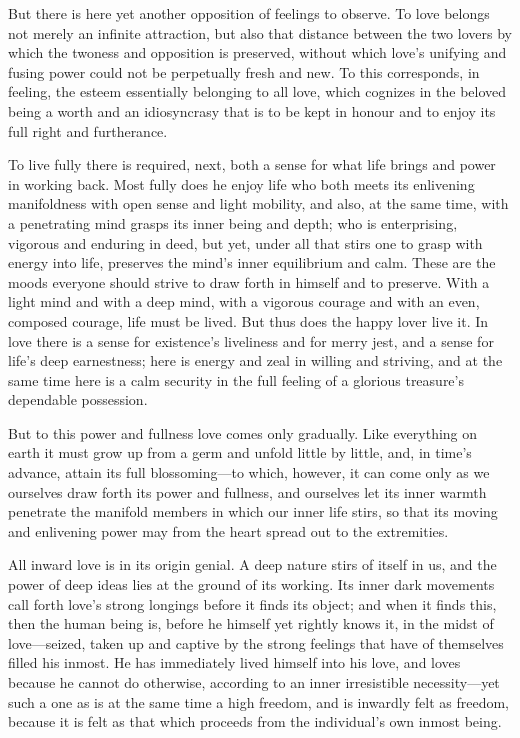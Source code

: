\documentclass[12pt,a4paper]{book}
\begin{document}
But there is here yet another opposition of feelings to observe. To love
belongs not merely an infinite attraction, but also that distance between
the two lovers by which the twoness and opposition is preserved, without
which love's unifying and fusing power could not be perpetually fresh and
new. To this corresponds, in feeling, the esteem essentially belonging to
all love, which cognizes in the beloved being a worth and an idiosyncrasy
that is to be kept in honour and to enjoy its full right and furtherance.

To live fully there is required, next, both a sense for what life brings and
power in working back. Most fully does he enjoy life who both meets its
enlivening manifoldness with open sense and light mobility, and also, at the
same time, with a penetrating mind grasps its inner being and depth; who is
enterprising, vigorous and enduring in deed, but yet, under all that stirs
one to grasp with energy into life, preserves the mind's inner equilibrium
and calm. These are the moods everyone should strive to draw forth in
himself and to preserve. With a light mind and with a deep mind, with a
vigorous courage and with an even, composed courage, life must be lived.
But thus does the happy lover live it. In love there is a sense for
existence's liveliness and for merry jest, and a sense for life's deep
earnestness; here is energy and zeal in willing and striving, and at the
same time here is a calm security in the full feeling of a glorious treasure's
dependable possession.

But to this power and fullness love comes only gradually. Like everything on
earth it must grow up from a germ and unfold little by little, and, in
time's advance, attain its full blossoming---to which, however, it can come
only as we ourselves draw forth its power and fullness, and ourselves let
its inner warmth penetrate the manifold members in which our inner life
stirs, so that its moving and enlivening power may from the heart spread out
to the extremities.

All inward love is in its origin genial. A deep nature stirs of itself in
us, and the power of deep ideas lies at the ground of its working. Its inner
dark movements call forth love's strong longings before it finds its
object; and when it finds this, then the human being is, before he himself
yet rightly knows it, in the midst of love---seized, taken up and captive by
the strong feelings that have of themselves filled his inmost. He has
immediately lived himself into his love, and loves because he cannot do
otherwise, according to an inner irresistible necessity---yet such a one as
is at the same time a high freedom, and is inwardly felt as freedom, because
it is felt as that which proceeds from the individual's own inmost being.
\end{document}
